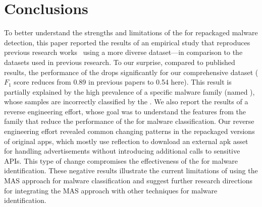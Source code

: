\section{Conclusions}\label{sec:conclusions}


To better understand the strengths and limitations of the \mas for repackaged malware detection, this paper reported the results of an empirical study that reproduces previous research works~\cite{DBLP:conf/wcre/BaoLL18,DBLP:journals/jss/CostaMMSSBNR22} using a more diverse dataset---in comparison to the datasets used in previous research. To our surprise, compared to published results, the performance of the \mas drops significantly for our comprehensive dataset ($F_1$ score reduces from 0.89 in previous papers to 0.54 here). This result is partially explained by the high prevalence of a specific malware family (named \gps), whose samples are incorrectly classified by the \mas. We also report the results of a reverse engineering effort, whose goal was to understand the features from the \gps family that reduce the performance of the \mas for malware classification. Our reverse engineering effort revealed common changing patterns in the \gps repackaged versions of original apps, which mostly use reflection to download an external apk asset for handling advertisements without introducing additional calls to sensitive APIs. This type of change compromises the effectiveness of the \mas for malware identification. These negative results illustrate the current limitations of using the MAS approach for malware classification and suggest further research directions for integrating the MAS approach with other techniques for malware identification.



